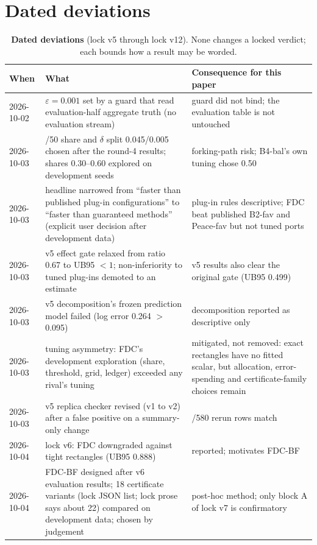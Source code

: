 \documentclass[sigconf,anonymous,review]{acmart}
\newcommand{\eps}{\varepsilon}
\begin{document}
\section{Dated deviations}\label{app:deviations}

\begin{table}[t]
\caption{\textbf{Dated deviations} (lock v5 through lock v12). None changes a locked verdict; each bounds how a result may be worded.}
\label{tab:deviations}
\small
\begin{tabular}{@{}l>{\raggedright\arraybackslash}p{6.6cm}>{\raggedright\arraybackslash}p{7.6cm}@{}}
\toprule
When & What & Consequence for this paper \\
\midrule
2026-10-02 & $\eps = 0.001$ set by a guard that read evaluation-half aggregate truth (no evaluation stream) & guard did not bind; the evaluation table is not untouched \\
2026-10-03 & 50/50 share and $\delta$ split 0.045/0.005 chosen after the round-4 results; shares 0.30--0.60 explored on development seeds & forking-path risk; B4-bal's own tuning chose 0.50 \\
2026-10-03 & headline narrowed from ``faster than published plug-in configurations'' to ``faster than guaranteed methods'' (explicit user decision after development data) & plug-in rules descriptive; FDC beat published B2-fav and Peace-fav but not tuned ports \\
2026-10-03 & v5 effect gate relaxed from ratio 0.67 to UB95 $< 1$; non-inferiority to tuned plug-ins demoted to an estimate & v5 results also clear the original gate (UB95 0.499) \\
2026-10-03 & v5 decomposition's frozen prediction model failed (log error 0.264 $>$ 0.095) & decomposition reported as descriptive only \\
2026-10-03 & tuning asymmetry: FDC's development exploration (share, threshold, grid, ledger) exceeded any rival's tuning & mitigated, not removed: exact rectangles have no fitted scalar, but allocation, error-spending and certificate-family choices remain \\
2026-10-03 & v5 replica checker revised (v1 to v2) after a false positive on a summary-only change & 580/580 rerun rows match \\
2026-10-04 & lock v6: FDC downgraded against tight rectangles (UB95 0.888) & reported; motivates FDC-BF \\
2026-10-04 & FDC-BF designed after v6 evaluation results; 18 certificate variants (lock JSON list; lock prose says about 22) compared on development data; chosen by judgement & post-hoc method; only block A of lock v7 is confirmatory \\

\end{tabular}
\end{table}
\end{document}

